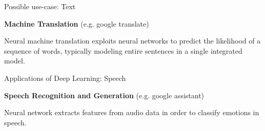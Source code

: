 \begin{frame} {Possible use-case: Text}

  \begin{figure}
    \centering
  \end{figure}
  
\textbf{Machine Translation} (e.g. google translate) 

Neural machine translation exploits neural networks to predict the likelihood of a sequence of words, typically modeling entire sentences in a single integrated model.
\end{frame}

\begin{frame} {Applications of Deep Learning: Speech}

  \begin{figure}
    \centering
  \end{figure}
  
\textbf{Speech Recognition and Generation} (e.g. google assistant)

Neural network extracts features from audio data in order to classify emotions in speech.

\end{frame}

\endlecture

